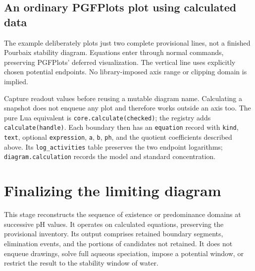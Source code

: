 \documentclass[a4paper,11pt]{ltxdoc}
\begin{document}
\subsection{An ordinary PGFPlots plot using calculated data}
The example deliberately plots just two complete provisional lines, not a
finished Pourbaix stability diagram. Equations enter through normal
 commands, preserving PGFPlots' deferred visualization. The vertical
line uses explicitly chosen potential endpoints. No library-imposed axis range
or clipping domain is implied.
\begin{codeexample}[width=7cm]
\lines
{}
\end{codeexample}
Capture readout values before reusing a mutable diagram name. Calculating a
snapshot does not enqueue any plot and therefore works outside an axis too.
The pure Lua equivalent is \texttt{core.calculate(checked)}; the registry adds
\texttt{calculate(handle)}. Each boundary then has an \texttt{equation} record
with \texttt{kind}, \texttt{text}, optional \texttt{expression}, \texttt{a},
\texttt{b}, \texttt{ph}, and the quotient coefficients described above.
Its \texttt{log\_activities} table preserves the two endpoint logarithms;
\texttt{diagram.calculation} records the model and standard concentration.

\section{Finalizing the limiting diagram}
\label{sec:selection}
This stage reconstructs the sequence of existence or predominance domains at
successive pH values. It operates on calculated equations, preserving the
provisional inventory. Its output comprises retained boundary segments,
elimination events, and the portions of candidates not retained. It does not
enqueue drawings, solve full aqueous speciation, impose a potential window, or
restrict the result to the stability window of water.
\end{document}
